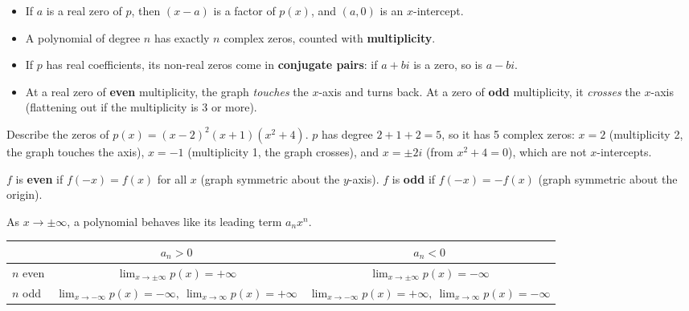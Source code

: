 \documentclass[11pt]{article}
\begin{document}
\begin{keyidea}
\begin{itemize}
\item If $a$ is a real zero of $p$, then $(x-a)$ is a factor of $p(x)$, and $(a,0)$ is an $x$-intercept.
\item A polynomial of degree $n$ has exactly $n$ complex zeros, counted with \textbf{multiplicity}.
\item If $p$ has real coefficients, its non-real zeros come in \textbf{conjugate pairs}: if $a+bi$ is a zero, so is $a-bi$.
\item At a real zero of \textbf{even} multiplicity, the graph \emph{touches} the $x$-axis and turns back. At a zero of \textbf{odd} multiplicity, it \emph{crosses} the $x$-axis (flattening out if the multiplicity is 3 or more).
\end{itemize}
\end{keyidea}

\begin{example}
Describe the zeros of $p(x)=(x-2)^2(x+1)(x^2+4)$.
\sol $p$ has degree $2+1+2=5$, so it has 5 complex zeros: $x=2$ (multiplicity 2, the graph touches the axis), $x=-1$ (multiplicity 1, the graph crosses), and $x=\pm 2i$ (from $x^2+4=0$), which are not $x$-intercepts.
\end{example}

\begin{keyidea}
$f$ is \textbf{even} if $f(-x)=f(x)$ for all $x$ (graph symmetric about the $y$-axis). $f$ is \textbf{odd} if $f(-x)=-f(x)$ (graph symmetric about the origin).
\end{keyidea}

As $x\to\pm\infty$, a polynomial behaves like its leading term $a_nx^n$.

\begin{center}
\renewcommand{\arraystretch}{1.3}
\begin{tabular}{l|c|c}
& $a_n>0$ & $a_n<0$\\\hline
$n$ even & $\displaystyle\lim_{x\to\pm\infty}p(x)=+\infty$ & $\displaystyle\lim_{x\to\pm\infty}p(x)=-\infty$\\\hline
$n$ odd & $\displaystyle\lim_{x\to-\infty}p(x)=-\infty,\ \lim_{x\to\infty}p(x)=+\infty$ & $\displaystyle\lim_{x\to-\infty}p(x)=+\infty,\ \lim_{x\to\infty}p(x)=-\infty$
\end{tabular}
\end{center}
\end{document}

